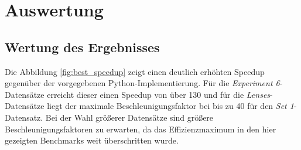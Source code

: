\chapter{Auswertung}

\section{Wertung des Ergebnisses}

Die Abbildung \ref{fig:best_speedup} zeigt einen deutlich erhöhten Speedup gegenüber der vorgegebenen Python-Implementierung. Für die \textit{Experiment 6}-Datensätze erreicht dieser einen Speedup von über 130 und für die \textit{Lenses}-Datensätze liegt der maximale Beschleunigungsfaktor bei bis zu 40 für den \textit{Set 1}-Datensatz. Bei der Wahl größerer Datensätze sind größere Beschleunigungsfaktoren zu erwarten, da das Effizienzmaximum in den hier gezeigten Benchmarks weit überschritten wurde. 

